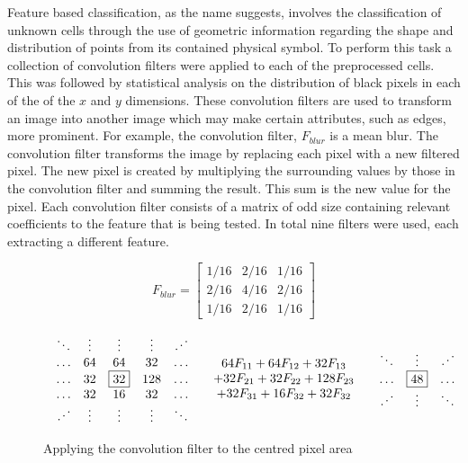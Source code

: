 Feature based classification, as the name suggests, involves the classification of unknown cells through the use of geometric information regarding the shape and distribution of points from its contained physical symbol. To perform this task a collection of convolution filters were applied to each of the preprocessed cells. This was followed by statistical analysis on the distribution of black pixels in each of the of the $x$ and $y$ dimensions. These convolution filters are used to transform an image into another image which may make certain attributes, such as edges, more prominent.  For example, the convolution filter, $F_{blur}$ is a mean blur. The convolution filter transforms the image by replacing each pixel with a new filtered pixel. The new pixel is created by multiplying the surrounding values by those in the convolution filter and summing the result. This sum is the new value for the pixel. Each convolution filter consists of a matrix of odd size containing relevant coefficients to the feature that is being tested. In total nine filters were used, each extracting a different feature. 

\[ F_{blur} = \left[
\begin{array}{ccc}
1/16 & 2/16 & 1/16 \\
2/16 & 4/16 & 2/16 \\
1/16 & 2/16 & 1/16
\end{array}\right]
\]

\begin{figure}[h] \[
\begin{array}{lcr}
\begin{array}{ccccc}
\ddots & \vdots & \vdots & \vdots & \iddots \\
\ldots & 64 & 64 & 32 & \ldots \\
\ldots & 32 & \fbox{32} & 128 & \ldots \\
\ldots & 32 & 16 & 32 & \ldots \\
\iddots & \vdots & \vdots & \vdots & \ddots \\
\end{array} &
\begin{array}{c}
64F_{11} + 64F_{12} + 32F_{13} \\
+ 32F_{21} + 32F_{22} + 128F_{23} \\
+ 32F_{31} + 16F_{32} + 32F_{32} \\
\end{array} &
\begin{array}{ccccc}
\ddots & \vdots & \iddots \\
\ldots &  \fbox{48}  & \ldots \\
\iddots & \vdots & \ddots \\
\end{array}
\end{array} \]
\caption{Applying the convolution filter to the centred pixel area}
\label{figure:convolution}
\end{figure}

